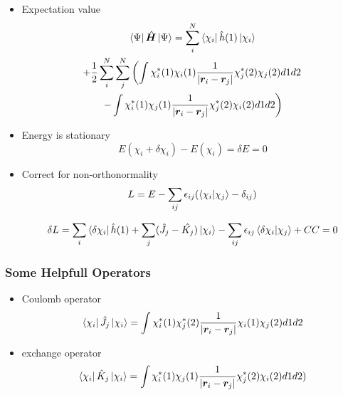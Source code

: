 \documentclass{beamer}
\begin{document}
\begin{frame}
    \begin{itemize}
        \item Expectation value
        \begin{multline*}
            \bra{\Psi}\hat{\boldsymbol{H}}\ket{\Psi} = \sum_i^N\bra{\chi_i}\hat{h}(1)\ket{\chi_i} \\
            + \frac{1}{2}\sum_i^N\sum_j^N\left(\int\chi_i^*(1)\chi_i(1)\frac{1}{|\boldsymbol{r}_i- \boldsymbol{r}_j|}\chi_j^*(2)\chi_j(2)d1d2 \right.\\
             \left. - \int\chi_i^*(1)\chi_j(1)\frac{1}{|\boldsymbol{r}_i - \boldsymbol{r}_j|}\chi_j^*(2)\chi_i(2)d1d2\right)
        \end{multline*}
    \end{itemize}
\end{frame}

\begin{frame}
    \begin{itemize}
        \item Energy is stationary
        \begin{equation*}
            E(\chi_i + \delta\chi_i) - E(\chi_i) =\delta E = 0
        \end{equation*}
        \item Correct for non-orthonormality
        \begin{equation*}
            L = E - \sum_{ij}\epsilon_{ij}(\braket{\chi_i|\chi_j} - \delta_{ij})
        \end{equation*}
        
        \begin{equation*}
            \delta L = \sum_i\bra{\delta\chi_i}\hat{h}(1) + \sum_j(\hat{J_j} - \hat{K_j})\ket{\chi_i} -  \sum_{ij}\epsilon_{ij}\braket{\delta\chi_i|\chi_j} + CC = 0
        \end{equation*}
    \end{itemize}
\end{frame}

\begin{frame}
    \frametitle{Some Helpfull Operators}
    \begin{itemize}
        \item Coulomb operator
        \begin{equation*}
            \bra{\chi_i}\hat{J}_j\ket{\chi_i} = \int\chi_i^*(1)\chi_j^*(2)\frac{1}{|\boldsymbol{r}_i- \boldsymbol{r}_j|}\chi_i(1)\chi_j(2)d1d2
         \end{equation*}
        \item exchange operator
        \begin{equation*}
            \bra{\chi_i}\hat{K}_j\ket{\chi_i} = \int\chi_i^*(1)\chi_j(1)\frac{1}{|\boldsymbol{r}_i - \boldsymbol{r}_j|}\chi_j^*(2)\chi_i(2)d1d2)
        \end{equation*}
    \end{itemize}
\end{frame}
\end{document}
